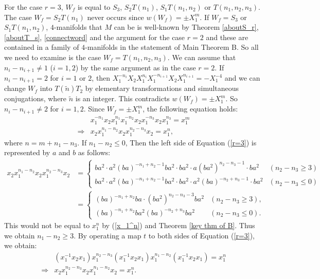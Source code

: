 \documentclass{amsart}
\theoremstyle{plain}
\theoremstyle{definition}
\begin{document}
\par

For the case $r=3$, $W_f$ is equal to $S_3$, $S_2T(n_1)$, $S_1T(n_1,n_2)$ or $T(n_1,n_2,n_3)$. 
The case $W_f=S_2T(n_1)$ never occurs since $w(W_f)=\pm X_1^m$. 
If $W_f=S_3$ or $S_1T(n_1,n_2)$, $4$-manifolds that $M$ can be is well-known by Theorem \ref{aboutS_r}, \ref{aboutT_s}, \ref{connectword} and the argument for the case $r=2$ 
and these are contained in a family of $4$-manifolds in the statement of Main Theorem B. 
So all we need to examine is the case $W_f=T(n_1,n_2,n_3)$. 
We can assume that $n_i-n_{i+1}\neq 1$ ($i=1,2$) by the same argument as in the case $r=2$. 
If $n_i-n_{i+1}=2$ for $i=1$ or $2$, then $X_1^{-n_i}X_2X_1^{n_i}X_1^{-n_{i+1}}X_2X_1^{n_{i+1}}=-X_1^{-4}$ and we can change $W_f$ into $T(\tilde{n})T_2$ by elementary transformations and simultaneous conjugations, where $\tilde{n}$ is an integer. 
This contradicts $w(W_f)=\pm X_1^m$. 
So $n_i-n_{i+1}\neq 2$ for $i=1,2$. 
Since $W_f=\pm X_1^m$, the following equation holds: 
{\allowdisplaybreaks
\begin{align}
\label{r=3}
& x_1^{-n_1}x_2x_1^{n_1}x_1^{-n_2}x_2x_1^{-n_3}x_2x_1^{n_3}=x_1^m \nonumber \\
\Rightarrow & x_2x_1^{n_1-n_2}x_2x_1^{n_2-n_3}x_2=x_1^n, 
\end{align}
}
where $n=m+n_1-n_3$. 
If $n_1-n_2\leq 0$, Then the left side of Equation (\ref{r=3}) is represented by $a$ and $b$ as follows: 
{\allowdisplaybreaks
\begin{align*}
x_2x_1^{n_1-n_2}x_2x_1^{n_2-n_3}x_2 & =\begin{cases}
ba^2\cdot a^2(ba)^{-n_1+n_2-1}ba^2\cdot ba^2\cdot a(ba^2)^{n_2-n_3-1}\cdot ba^2 & (n_2-n_3\geq 3) \\
ba^2\cdot a^2(ba)^{-n_1+n_2-1}ba^2\cdot ba^2\cdot a^2(ba)^{-n_2+n_3-1}\cdot ba^2 & (n_2-n_3\leq 0) 
\end{cases} \\
& = \begin{cases}
(ba)^{-n_1+n_2}ba\cdot (ba^2)^{n_2-n_3-3}ba^2 & (n_2-n_3\geq 3), \\
(ba)^{-n_1+n_2}ba^2(ba)^{-n_2+n_3}ba^2 & (n_2-n_3\leq 0).
\end{cases}
\end{align*}
}
This would not be equal to $x_1^n$ by (\ref{x_1^n}) and Theorem \ref{key thm of B}. 
Thus we obtain $n_1-n_2\geq 3$. 
By operating a map $t$ to both sides of Equation (\ref{r=3}), we obtain: 
{\allowdisplaybreaks
\begin{align*}
& (x_1^{-1}x_2x_1)x_1^{n_2-n_3}(x_1^{-1}x_2x_1)x_1^{n_1-n_2}(x_1^{-1}x_2x_1)=x_1^n \\
\Rightarrow & x_2x_1^{n_2-n_3}x_2x_1^{n_1-n_2}x_2=x_1^n. 
\end{align*}
}
\end{document}
